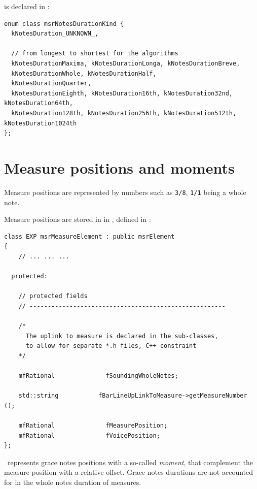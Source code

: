  is declared in :
\begin{lstlisting}[language=CPlusPlus]
enum class msrNotesDurationKind {
  kNotesDuration_UNKNOWN_,

  // from longest to shortest for the algorithms
  kNotesDurationMaxima, kNotesDurationLonga, kNotesDurationBreve,
  kNotesDurationWhole, kNotesDurationHalf,
  kNotesDurationQuarter,
  kNotesDurationEighth, kNotesDuration16th, kNotesDuration32nd, kNotesDuration64th,
  kNotesDuration128th, kNotesDuration256th, kNotesDuration512th, kNotesDuration1024th
};
\end{lstlisting}

\section{Measure positions and moments}\label{Measure positions and moments}

Measure positions are represented by  numbers such as {\tt 3/8}, {\tt 1/1} being a whole note.

Measure positions are stored in  in , defined in :
\begin{lstlisting}[language=CPlusPlus]
class EXP msrMeasureElement : public msrElement
{
	// ... ... ...

  protected:

    // protected fields
    // ------------------------------------------------------

    /*
      The uplink to measure is declared in the sub-classes,
      to allow for separate *.h files, C++ constraint
    */

    mfRational              fSoundingWholeNotes;

    std::string           fBarLineUpLinkToMeasure->getMeasureNumber ();

    mfRational              fMeasurePosition;
    mfRational              fVoicePosition;
};
\end{lstlisting}

\lily\ represents grace notes positions with a so-called {\it moment}, that complement the measure position with a relative offset. Grace notes durations are not accounted for in the whole notes duration of measures.


